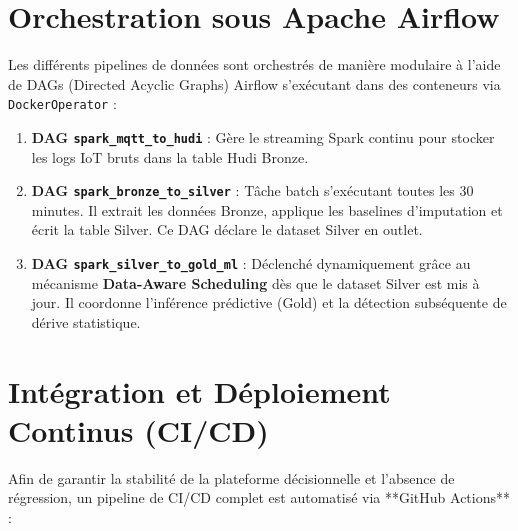 \documentclass[12pt]{report}
\begin{document}
\section{Orchestration sous Apache Airflow}
Les différents pipelines de données sont orchestrés de manière modulaire à l'aide de DAGs (Directed Acyclic Graphs) Airflow s'exécutant dans des conteneurs via \texttt{DockerOperator} :
\begin{enumerate}
    \item \textbf{DAG \texttt{spark\_mqtt\_to\_hudi}} : Gère le streaming Spark continu pour stocker les logs IoT bruts dans la table Hudi Bronze.
    \item \textbf{DAG \texttt{spark\_bronze\_to\_silver}} : Tâche batch s'exécutant toutes les 30 minutes. Il extrait les données Bronze, applique les baselines d'imputation et écrit la table Silver. Ce DAG déclare le dataset Silver en outlet.
    \item \textbf{DAG \texttt{spark\_silver\_to\_gold\_ml}} : Déclenché dynamiquement grâce au mécanisme \textbf{Data-Aware Scheduling} dès que le dataset Silver est mis à jour. Il coordonne l'inférence prédictive (Gold) et la détection subséquente de dérive statistique.
\end{enumerate}

\section{Intégration et Déploiement Continus (CI/CD)}
Afin de garantir la stabilité de la plateforme décisionnelle et l'absence de régression, un pipeline de CI/CD complet est automatisé via **GitHub Actions** :
\end{document}
